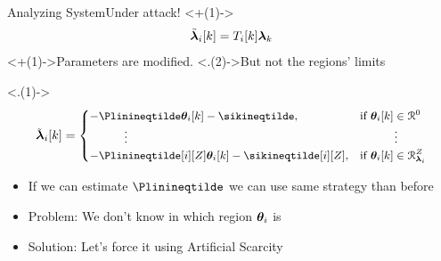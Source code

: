 \documentclass[handout,aspectratio=169]{beamer}
\begin{document}
\begin{frame}{Analyzing System}{Under attack!}
  \centering
  \vspace{-1cm}
  \onslide<+(1)->{
    \begin{equation*}
      \tilde{\boldsymbol{\lambda}}_{i}[k]=T_{i}[k]\boldsymbol{\lambda}_{k}
    \end{equation*}
  }
  \onslide<+(1)->{Parameters are modified.} \onslide<.(2)->{But not the regions' limits}

  \onslide<.(1)->{
  \begin{equation*}
    \small
      \lambdaicheat[k]=
      \begin{cases}
        -\Plinineqtilde      \thetaik-\sikineqtilde      ,&\text{if }\thetaik\in\set{R}^{0}\tikzmark{a}\\
        \qquad\quad \vdots&\qquad\quad \vdots\\
        -\Plinineqtilde[i][Z]\thetaik-\sikineqtilde[i][Z],&\text{if}\ \thetaik \in\set{R}_{\lambdai}^{Z}\\
      \end{cases}
  \end{equation*}
  }

  \begin{itemize}[<+(2)->]
    \item If we can estimate $\Plinineqtilde$ we can use same strategy than before
    \item Problem: We don't know in which region $\boldsymbol{\theta}_{i}$ is
    \item Solution: Let's force it using Artificial Scarcity
  \end{itemize}
\end{frame}
\end{document}

